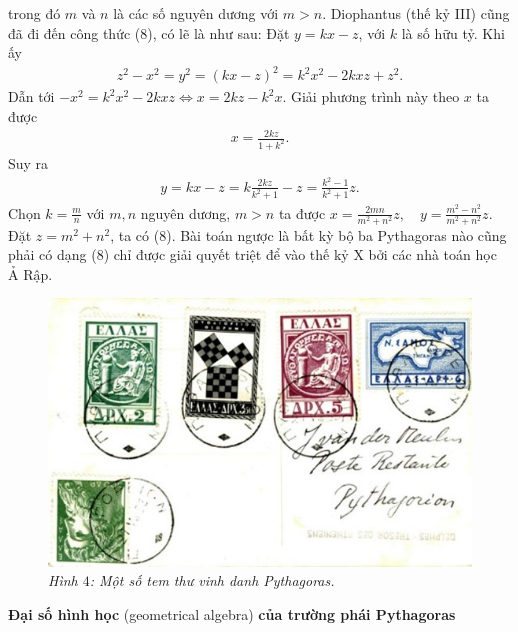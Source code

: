\begin{multicols}{2}
	trong đó $m$  và $n$  là các số nguyên dương với $m >n$.
	\vskip 0.1cm 
	Diophantus (thế kỷ III) cũng đã đi đến công thức ($8$), có lẽ là như sau:
	\vskip 0.1cm
	Đặt $y = kx -z$, với $k$ là số hữu tỷ. Khi ấy
	\begin{align*}
		{z^2} - {x^2} = {y^2} = {\left( {kx - z} \right)^2} = {k^2}{x^2} - 2kxz + {z^2}.
	\end{align*}
	Dẫn tới $ - {x^2} = {k^2}{x^2} - 2kxz \Leftrightarrow x = 2kz - {k^2}x$.
	\vskip 0.1cm   
	Giải phương trình này theo $x$  ta được
	\begin{align*}
		x = \frac{{2kz}}{{1 + {k^2}}}.
	\end{align*}
	Suy ra 
	\begin{align*}
		y = kx - z = k\frac{{2kz}}{{{k^2} + 1}} - z = \frac{{{k^2} - 1}}{{{k^2} + 1}}z.
	\end{align*}
	Chọn $k = \frac{m}{n}$  với $m,n$  nguyên dương, $m >n$  ta được   $x = \frac{{2mn}}{{{m^2} + {n^2}}}z,\quad y = \frac{{{m^2} - {n^2}}}{{{m^2} + {n^2}}}z$.
	\vskip 0.1cm
	Đặt  $z = {m^2} + {n^2}$, ta có ($8$).
	\vskip 0.1cm
	Bài toán ngược là bất kỳ bộ ba Pythagoras nào cũng phải có dạng ($8$) chỉ được giải quyết triệt để vào thế kỷ X bởi các nhà toán học Ả Rập.
	\begin{figure}[H]
		\vspace*{-5pt}
		\centering
		\captionsetup{labelformat= empty, justification=centering}
		\includegraphics[width= 1\linewidth]{16}
		\caption{\small\textit{\color{lichsutoanhoc}Hình $4$: Một số tem thư vinh danh  Pythagoras.}}
		\vspace*{-10pt}
	\end{figure}
	\textbf{\color{lichsutoanhoc}Đại số hình học} (geometrical algebra) \textbf{\color{lichsutoanhoc}của trường phái Pythagoras}

\end{multicols}
